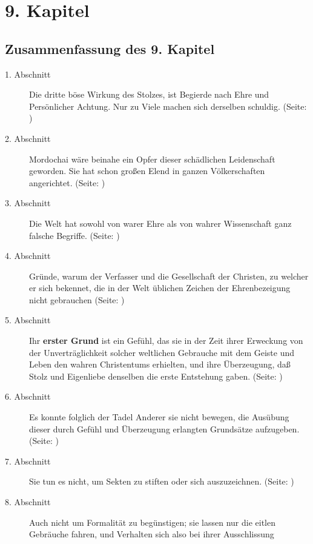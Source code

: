

\chapter{9. Kapitel} \label{kap9}


\section{Zusammenfassung des 9. Kapitel}
\footnotesize
\begin{description}
\item[1. Abschnitt] Die dritte böse Wirkung des Stolzes, ist Begierde nach Ehre
und Persönlicher Achtung. Nur zu Viele machen sich derselben schuldig. (Seite: \pageref{kap9_ab1})
\item[2. Abschnitt] Mordochai wäre beinahe ein Opfer dieser schädlichen
Leidenschaft geworden. Sie hat schon großen Elend in ganzen Völkerschaften
angerichtet. (Seite: \pageref{kap9_ab2})
\item[3. Abschnitt] Die Welt hat sowohl von warer Ehre als von wahrer
Wissenschaft ganz falsche Begriffe. (Seite: \pageref{kap9_ab3})
\item[4. Abschnitt] Gründe, warum der Verfasser und die Gesellschaft der
Christen, zu welcher er sich bekennet, die in der Welt üblichen Zeichen der
Ehrenbezeigung nicht gebrauchen (Seite: \pageref{kap9_ab4})
\item[5. Abschnitt] Ihr \textbf{erster Grund} ist ein Gefühl, das sie in der Zeit ihrer
Erweckung von der Unverträglichkeit solcher weltlichen Gebrauche mit dem Geiste
und Leben den wahren Christentums erhielten, und ihre Überzeugung, daß Stolz
und Eigenliebe denselben die erste Entstehung gaben. (Seite: \pageref{kap9_ab5})
\item[6. Abschnitt] Es konnte folglich der Tadel Anderer sie nicht bewegen, die
Ausübung dieser durch Gefühl und Überzeugung erlangten Grundsätze aufzugeben. (Seite: \pageref{kap9_ab6})
\item[7. Abschnitt] Sie tun es nicht, um Sekten zu stiften oder sich
auszuzeichnen. (Seite: \pageref{kap9_ab7})
\item[8. Abschnitt] Auch nicht um Formalität zu begünstigen; sie lassen nur die
eitlen Gebräuche fahren, und Verhalten sich also bei ihrer Ausschlissung

\end{description}
